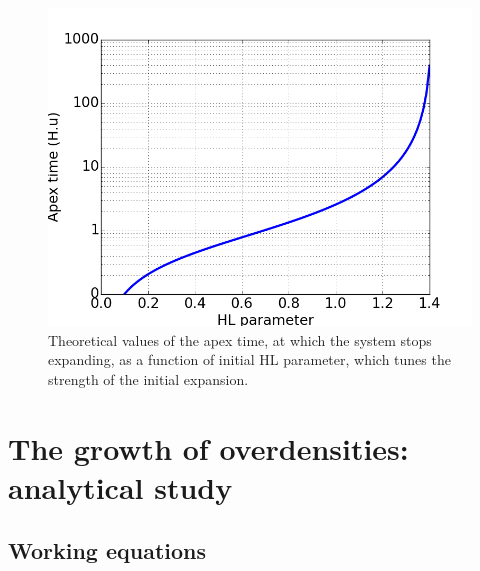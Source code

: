 \begin{figure}
\center
\includegraphics[width=0.7\linewidth]{Figures/1_apextime.png}
\caption{Theoretical values of the apex time, at which the system stops expanding, as a function of initial HL parameter, which tunes the strength of the initial expansion.}
\label{Fig:apextime}
\end{figure} 





\section{The growth of overdensities: analytical study}



\subsection{Working equations}



